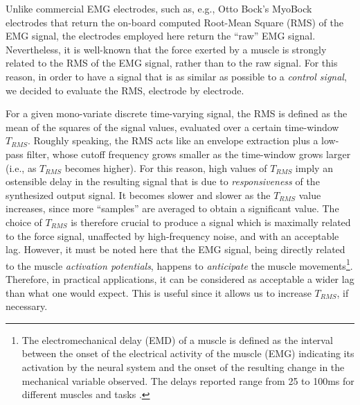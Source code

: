 Unlike commercial EMG electrodes, such as, e.g., Otto Bock's MyoBock
electrodes \cite{ottobock} that return the on-board computed Root-Mean
Square (RMS) of the EMG signal, the electrodes employed here return
the ``raw'' EMG signal.%
Nevertheless, it is well-known \cite{deluca,zecca} that the force
exerted by a muscle is strongly related to the RMS of the EMG signal,
rather than to the raw signal. For this reason, in order to have a
signal that is as similar as possible to a \emph{control signal}, we
decided to evaluate the RMS, electrode by electrode.

For a given mono-variate discrete time-varying signal, the RMS is
defined as the mean of the squares of the signal values, evaluated
over a certain time-window $T_{RMS}$. Roughly speaking, the RMS acts
like an envelope extraction plus a low-pass filter, whose cutoff
frequency grows smaller as the time-window grows larger (i.e., as
$T_{RMS}$ becomes higher). For this reason, high values of $T_{RMS}$
imply an ostensible delay in the resulting signal that is due to
\emph{responsiveness} of the synthesized output signal.  It becomes
slower and slower as the $T_{RMS}$ value increases, since more
``samples'' are averaged to obtain a significant value. The choice of
$T_{RMS}$ is therefore crucial to produce a signal which is maximally
related to the force signal, unaffected by high-frequency noise, and
with an acceptable lag. However, it must be noted here that the EMG
signal, being directly related to the muscle \emph{activation
potentials}, happens to \emph{anticipate} the muscle
movements\footnote{The electromechanical delay (EMD) of a muscle is
defined as the interval between the onset of the electrical activity
of the muscle (EMG) indicating its activation by the neural system and
the onset of the resulting change in the mechanical variable
observed. The delays reported range from 25 to 100ms for different
muscles and tasks \cite{Wolf1994}.}. Therefore, in practical
applications, it can be considered as acceptable a wider lag than what
one would expect.
This is useful since it allows us to increase $T_{RMS}$, if necessary.

